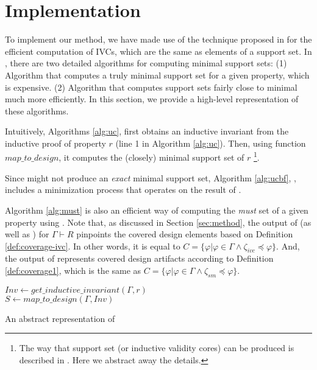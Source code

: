 \section{Implementation}
\label{sec:impl}

To implement our method, we have made use of the technique proposed in \cite{Ghass16} for the efficient computation of IVCs, which are the same as elements of a support set. In \cite{Ghass16}, there are two detailed algorithms for computing minimal support sets: (1) Algorithm \ucbfalg that computes a truly minimal support set for a given property, which is expensive. (2) Algorithm \ucalg that computes support sets fairly close to minimal much more efficiently. In this section, we provide a high-level representation of these algorithms.

Intuitively, Algorithms \ref{alg:uc},
first obtains an inductive invariant from the inductive proof of
property $r$ (line 1 in Algorithm \ref{alg:uc}). Then, using function $map\_to\_design$, it
computes the (closely) minimal support set of $r$ \footnote{The way that support set
(or inductive validity cores) can be produced is described in \cite{Ghass16}. Here we abstract away the details.}.

Since \ucalg might not produce an \emph{exact} minimal support set,
Algorithm \ref{alg:ucbf}, \ucbfalg, includes a minimization process that
operates on the result of \ucalg.

Algorithm \ref{alg:must} is also an efficient way of computing the \emph{must} set of a given property using \ucalg. Note that, as discussed in Section \ref{sec:method}, the
output of \ucalg (as well as \ucbfalg) for $\Gamma \vdash R$ pinpoints the covered design elements
based on Definition \ref{def:coverage-ivc}.
In other words, it is equal to
$C = \{\varphi | \varphi \in \Gamma \wedge  \zeta_{ivc} \preccurlyeq \varphi \}$.
And, the output of \mustalg represents covered design artifacts according to Definition \ref{def:coverage1}, which is the same as $C = \{\varphi | \varphi \in \Gamma \wedge \zeta_{sm} \preccurlyeq \varphi \}$.

\begin{algorithm}
  \BlankLine
  $Inv \leftarrow get\_inductive\_invariant(\Gamma, r)$ \\
  $S \leftarrow map\_to\_design (\Gamma, Inv)$ \\
\caption{An abstract representation of \ucalg \cite{Ghass16}}
\label{alg:uc}
\end{algorithm}

